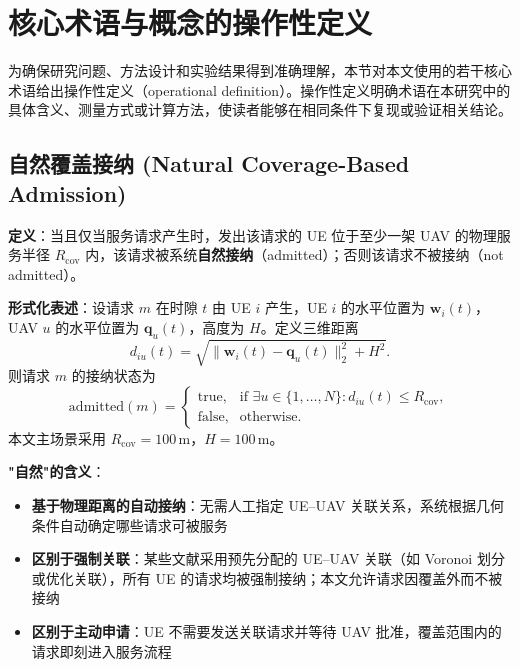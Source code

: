 \section{核心术语与概念的操作性定义}
\label{sec:ch2-core-terminology}

为确保研究问题、方法设计和实验结果得到准确理解，本节对本文使用的若干核心术语给出操作性定义（operational definition）。操作性定义明确术语在本研究中的具体含义、测量方式或计算方法，使读者能够在相同条件下复现或验证相关结论。

\subsection{自然覆盖接纳 (Natural Coverage-Based Admission)}
\label{sec:ch2-term-natural-admission}

\textbf{定义}：当且仅当服务请求产生时，发出该请求的 UE 位于至少一架 UAV 的物理服务半径 $R_{\mathrm{cov}}$ 内，该请求被系统\textbf{自然接纳}（admitted）；否则该请求不被接纳（not admitted）。

\textbf{形式化表述}：设请求 $m$ 在时隙 $t$ 由 UE $i$ 产生，UE $i$ 的水平位置为 $\mathbf{w}_i(t)$，UAV $u$ 的水平位置为 $\mathbf{q}_u(t)$，高度为 $H$。定义三维距离
\begin{equation}
    d_{iu}(t) = \sqrt{\|\mathbf{w}_i(t) - \mathbf{q}_u(t)\|_2^2 + H^2}.
    \label{eq:ch2-term-distance}
\end{equation}
则请求 $m$ 的接纳状态为
\begin{equation}
    \text{admitted}(m) =
    \begin{cases}
        \text{true}, & \text{if } \exists u \in \{1,\ldots,N\}: d_{iu}(t) \leq R_{\mathrm{cov}}, \\
        \text{false}, & \text{otherwise}.
    \end{cases}
    \label{eq:ch2-term-admission}
\end{equation}
本文主场景采用 $R_{\mathrm{cov}} = 100\,\mathrm{m}$，$H = 100\,\mathrm{m}$。

\textbf{"自然"的含义}：
\begin{itemize}
    \item \textbf{基于物理距离的自动接纳}：无需人工指定 UE--UAV 关联关系，系统根据几何条件自动确定哪些请求可被服务
    \item \textbf{区别于强制关联}：某些文献采用预先分配的 UE--UAV 关联（如 Voronoi 划分或优化关联），所有 UE 的请求均被强制接纳；本文允许请求因覆盖外而不被接纳
    \item \textbf{区别于主动申请}：UE 不需要发送关联请求并等待 UAV 批准，覆盖范围内的请求即刻进入服务流程
\end{itemize}

